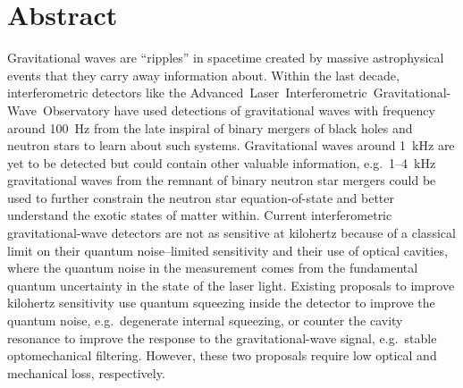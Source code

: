 \chapter*{Abstract}

Gravitational waves are ``ripples'' in spacetime created by massive astrophysical events that they carry away information about. Within the last decade, interferometric detectors like the Advanced~Laser~Interferometric~Gravitational-Wave~Observatory have used detections of gravitational waves with frequency around 100~Hz from the late inspiral of binary mergers of black holes and neutron stars to learn about such systems.
Gravitational waves around 1~kHz are yet to be detected but could contain other valuable information, e.g.\ 1--4~kHz gravitational waves from the remnant of binary neutron star mergers could be used to further constrain the neutron star equation-of-state and better understand the exotic states of matter within.
Current interferometric gravitational-wave detectors are not as sensitive at kilohertz because of a classical limit on their quantum noise--limited sensitivity and their use of optical cavities, where the quantum noise in the measurement comes from the fundamental quantum uncertainty in the state of the laser light. Existing proposals to improve kilohertz sensitivity use quantum squeezing inside the detector to improve the quantum noise, e.g.\ degenerate internal squeezing, or counter the cavity resonance to improve the response to the gravitational-wave signal, e.g.\ stable optomechanical filtering. However, these two proposals require low optical and mechanical loss, respectively.

